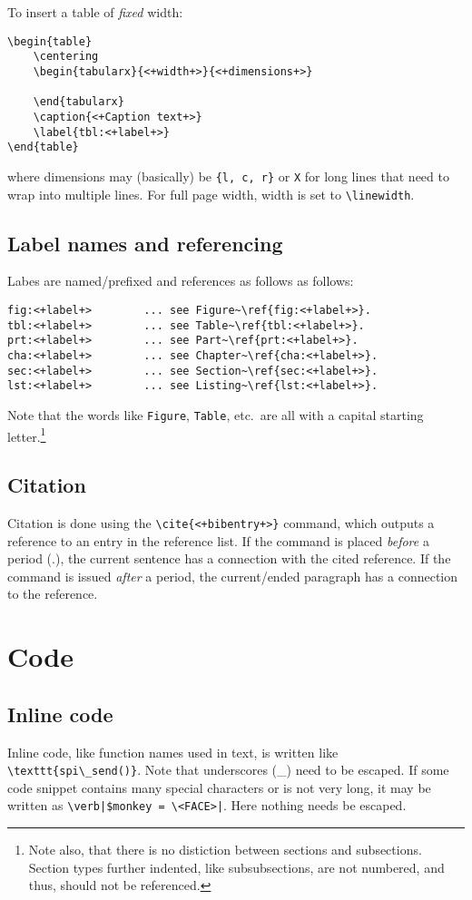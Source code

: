To insert a table of \emph{fixed} width:
\begin{verbatim}
\begin{table}
    \centering
    \begin{tabularx}{<+width+>}{<+dimensions+>}

    \end{tabularx}
    \caption{<+Caption text+>}
    \label{tbl:<+label+>}
\end{table}
\end{verbatim}
where dimensions may (basically) be \texttt{\{l, c, r\}} or \texttt{X} for long lines that need to wrap into multiple lines. For full page width, width is set to \verb|\linewidth|.


\subsection{Label names and referencing}
Labes are named\slash prefixed and references as follows as follows:
\begin{verbatim}
fig:<+label+>        ... see Figure~\ref{fig:<+label+>}. 
tbl:<+label+>        ... see Table~\ref{tbl:<+label+>}.
prt:<+label+>        ... see Part~\ref{prt:<+label+>}.
cha:<+label+>        ... see Chapter~\ref{cha:<+label+>}.
sec:<+label+>        ... see Section~\ref{sec:<+label+>}.
lst:<+label+>        ... see Listing~\ref{lst:<+label+>}.
\end{verbatim}
Note that the words like \texttt{Figure}, \texttt{Table}, etc.\ are all with a capital starting letter.\footnote{Note also, that there is no distiction between sections and subsections. Section types further indented, like subsubsections, are not numbered, and thus, should not be referenced.}


\subsection{Citation}
Citation is done using the \verb|\cite{<+bibentry+>}| command, which outputs a reference to an entry in the reference list. If the command is placed \emph{before} a period (.), the current sentence has a connection with the cited reference. If the command is issued \emph{after} a period, the current\slash ended paragraph has a connection to the reference.


\section{Code}
\label{sec:code}
\subsection{Inline code}
Inline code, like function names used in text, is written like \verb|\texttt{spi\_send()}|. Note that underscores (\_) need to be escaped. If some code snippet contains many special characters or is not very long, it may be written as \verb#\verb|$monkey = \<FACE>|#. Here nothing needs be escaped.


